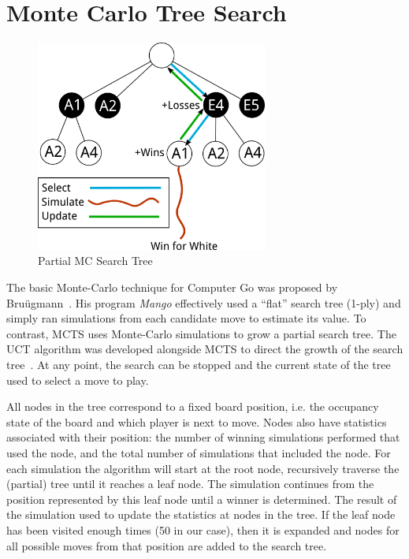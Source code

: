 \documentclass{acm_proc_article-sp}
\begin{document}
\section{Monte Carlo Tree Search} \label{mcts}

\begin{figure}
	\begin{center}
	\includegraphics[width=3.0in]{graphics/tree.png}
	\end{center}
	\caption{Partial MC Search Tree}
	\label{fig:tree}
\end{figure}


The basic Monte-Carlo technique for Computer Go was proposed by Bru\"{u}gmann~\cite{brugmann1993monte}. His program \emph{Mango} effectively used a ``flat'' search tree (1-ply) and simply ran simulations from each candidate move to estimate its value. To contrast, MCTS uses Monte-Carlo simulations to grow a partial  search tree. 
The UCT algorithm was developed alongside MCTS to direct the growth of the search tree~\cite{gelly2006exploration}. 
At any point, the search can be stopped and the current state of the tree used to select a move to play. 

All nodes in the tree correspond to a fixed board position, i.e. the occupancy state of the board and which player is next to move. 
Nodes also have statistics associated with their position:  the number of winning simulations performed that used the node, and the total number of simulations that included the node. 
For each simulation the algorithm will start at the root node, recursively traverse the (partial) tree until it reaches a leaf node.
The simulation continues from the position represented by this leaf node until a winner is determined.
The result of the simulation used to update the statistics at nodes in the tree.
If the leaf node has been visited enough times (50 in our case), then it is expanded and nodes for all possible moves from 
that position are added to the search tree.
\end{document}
